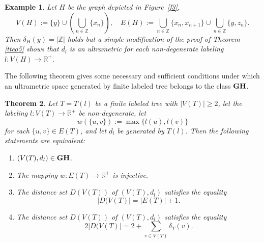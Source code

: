 \documentclass[pdflatex,sn-mathphys-num]{sn-jnl}%
\theoremstyle{thmstyleone}%
\newtheorem{Theorem}{Theorem}[section]
\theoremstyle{thmstyletwo}%
\newtheorem{Example}[Theorem]{Example}
\theoremstyle{thmstylethree}%
\theoremstyle{thmstyletwo}%
\theoremstyle{thmstylethree}%
\begin{document}
\begin{Example}\label{hau} Let $H$ be the graph depicted in Figure~\ref{f3},
\[
V(H):=\{y\}\cup\left(\bigcup_{n \in \mathbb Z} \{x_n\}\right),
\quad
E(H) := \bigcup_{n \in \mathbb{Z}} \{x_n, x_{n+1}\} \cup \bigcup_{n \in \mathbb{Z}} \{y, z_n\}.
\]
Then $\delta_H(y) = |\mathbb{Z}|$ holds but a simple modification of the proof of Theorem \ref{tteo5} shows that $d_l$ is an ultrametric for each non-degenerate labeling $l : V(H) \to \mathbb{R}^+$.
\end{Example}



The following theorem gives some necessary and sufficient conditions under which an ultrametric space generated by finite labeled tree belongs to the class ${\bf GH}$.




\begin{Theorem}\label{tteo6} Let $T =T (l)$ be a finite labeled tree with $|V(T)|\geq 2$, let the labeling $l : V(T) \to \mathbb{R}^+$ be non-degenerate, let 
\[
w(\{u,v\}) := \max\{l(u), l(v)\}
\]
for each $\{u,v\} \in E(T)$, and let $d_l$ be generated by $T(l)$.
Then  the following statements are equivalent:
\begin{enumerate}
\item[(i)] $(V(T), d_l) \in {\bf GH}$.
\item[(ii)] The mapping $w : E(T) \to \mathbb{R}^+$ is injective.
\item[(iii)] The distance set $D(V(T))$ of $(V(T),d_l)$ satisfies the equality  
\begin{equation}
    \label{k1}
|D(V(T)|=|E(T)|+1.
\end{equation}
\item[(iv)] The distance set $D(V(T))$ of $(V(T),d_l)$ satisfies the equality
\begin{equation*}
2|D(V(T)|=2+\sum\limits_{v\in V(T)} \delta_T(v).
\end{equation*}
\end{enumerate}
\end{Theorem}
\end{document}
